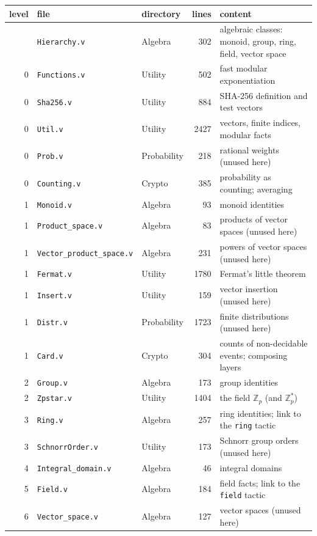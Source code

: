 \documentclass[11pt,a4paper]{article}
\theoremstyle{definition}
\theoremstyle{plain}
\begin{document}
{\small
\begin{longtable}{@{}rlp{}rp{}@{}}
\toprule
level & file & directory & lines & content\\
\midrule
\endhead
\bottomrule
\endfoot
0 & \texttt{Hierarchy.v} & Algebra & 302 & algebraic classes: monoid, group, ring, field, vector space\\
0 & \texttt{Functions.v} & Utility & 502 & fast modular exponentiation\\
0 & \texttt{Sha256.v} & Utility & 884 & SHA-256 definition and test vectors\\
0 & \texttt{Util.v} & Utility & 2427 & vectors, finite indices, modular facts\\
0 & \texttt{Prob.v} & Probability & 218 & rational weights (unused here)\\
0 & \texttt{Counting.v} & Crypto & 385 & probability as counting; averaging\\
1 & \texttt{Monoid.v} & Algebra & 93 & monoid identities\\
1 & \texttt{Product\_space.v} & Algebra & 83 & products of vector spaces (unused here)\\
1 & \texttt{Vector\_product\_space.v} & Algebra & 231 & powers of vector spaces (unused here)\\
1 & \texttt{Fermat.v} & Utility & 1780 & Fermat's little theorem\\
1 & \texttt{Insert.v} & Utility & 159 & vector insertion (unused here)\\
1 & \texttt{Distr.v} & Probability & 1723 & finite distributions (unused here)\\
1 & \texttt{Card.v} & Crypto & 304 & counts of non-decidable events; composing layers\\
2 & \texttt{Group.v} & Algebra & 173 & group identities\\
2 & \texttt{Zpstar.v} & Utility & 1404 & the field $\mathbb{Z}_p$ (and $\mathbb{Z}_p^*$)\\
3 & \texttt{Ring.v} & Algebra & 257 & ring identities; link to the \texttt{ring} tactic\\
3 & \texttt{SchnorrOrder.v} & Utility & 173 & Schnorr group orders (unused here)\\
4 & \texttt{Integral\_domain.v} & Algebra & 46 & integral domains\\
5 & \texttt{Field.v} & Algebra & 184 & field facts; link to the \texttt{field} tactic\\
6 & \texttt{Vector\_space.v} & Algebra & 127 & vector spaces (unused here)\\

\end{longtable}}
\end{document}
